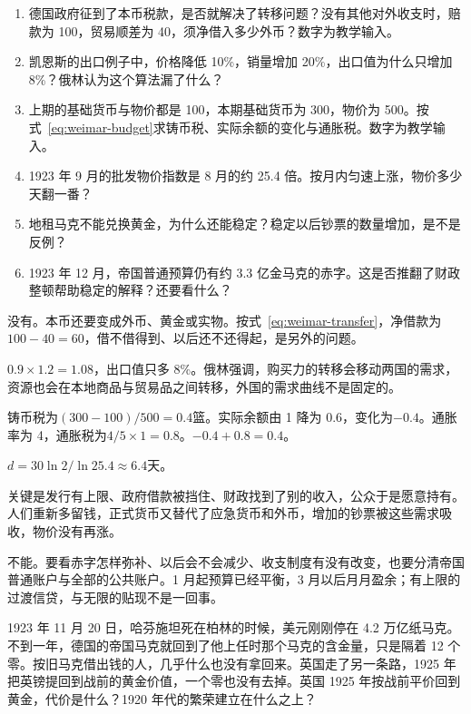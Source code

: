 \begin{selfcheck}
\begin{enumerate}
\item 德国政府征到了本币税款，是否就解决了转移问题？没有其他对外收支时，赔款为 100，贸易顺差为 40，须净借入多少外币？数字为教学输入。
\item 凯恩斯的出口例子中，价格降低 10\%，销量增加 20\%，出口值为什么只增加 8\%？俄林认为这个算法漏了什么？
\item 上期的基础货币与物价都是 100，本期基础货币为 300，物价为 500。按式~\eqref{eq:weimar-budget}求铸币税、实际余额的变化与通胀税。数字为教学输入。
\item 1923 年 9 月的批发物价指数是 8 月的约 25.4 倍。按月内匀速上涨，物价多少天翻一番？
\item 地租马克不能兑换黄金，为什么还能稳定？稳定以后钞票的数量增加，是不是反例？
\item 1923 年 12 月，帝国普通预算仍有约 3.3 亿金马克的赤字。这是否推翻了财政整顿帮助稳定的解释？还要看什么？
\end{enumerate}
\end{selfcheck}

\begin{answers}
\item 没有。本币还要变成外币、黄金或实物。按式~\eqref{eq:weimar-transfer}，净借款为$100-40=60$，借不借得到、以后还不还得起，是另外的问题。
\item $0.9\times1.2=1.08$，出口值只多 8\%。俄林强调，购买力的转移会移动两国的需求，资源也会在本地商品与贸易品之间转移，外国的需求曲线不是固定的。
\item 铸币税为$(300-100)/500=0.4$篮。实际余额由 1 降为 0.6，变化为$-0.4$。通胀率为 4，通胀税为$4/5\times1=0.8$。$-0.4+0.8=0.4$。
\item $d=30\ln2/\ln25.4\approx6.4$天。
\item 关键是发行有上限、政府借款被挡住、财政找到了别的收入，公众于是愿意持有。人们重新多留钱，正式货币又替代了应急货币和外币，增加的钞票被这些需求吸收，物价没有再涨。
\item 不能。要看赤字怎样弥补、以后会不会减少、收支制度有没有改变，也要分清帝国普通账户与全部的公共账户。1 月起预算已经平衡，3 月以后月月盈余；有上限的过渡信贷，与无限的贴现不是一回事。
\end{answers}

1923 年 11 月 20 日，哈芬施坦死在柏林的时候，美元刚刚停在 4.2 万亿纸马克。不到一年，德国的帝国马克就回到了他上任时那个马克的含金量，只是隔着 12 个零\cite{bresciani1937}。按旧马克借出钱的人，几乎什么也没有拿回来。英国走了另一条路，1925 年把英镑提回到战前的黄金价值，一个零也没有去掉\cite{keynes1925}。英国 1925 年按战前平价回到黄金，代价是什么？1920 年代的繁荣建立在什么之上？
